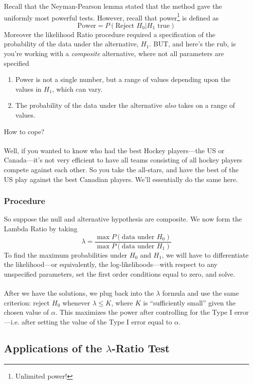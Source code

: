 \documentclass[a4paper,12pt]{scrartcl}
\begin{document}
Recall that the Neyman-Pearson lemma stated that the method gave
the uniformly most powerful tests. However, recall that power\footnote{
Unlimited power!} is defined as
   \[ \text{Power} = P(\text{Reject $H_0$} | \text{$H_1$ true}) \]
Moreover the likelihood Ratio procedure required a specification
of the probability of the data under the alternative, $H_1$. BUT,
and here's the rub, is you're working with a \emph{composite}
alternative, where not all parameters are specified
\begin{enumerate}
   \item Power is not a single number, but a range of values
      depending upon the values in $H_1$, which can vary.
   \item The probability of the data under the alternative \emph{also}
      takes on a range of values.
\end{enumerate}
How to cope?
\\
\\
Well, if you wanted to know who had the best Hockey players---the US
or Canada---it's not very efficient to have all teams consisting of
all hockey players compete against each other. So you take the
all-stars, and have the best of the US play against the best Canadian
players.  We'll essentially do the same here.

\subsubsection{Procedure}

So suppose the null and alternative hypothesis are composite.
We now form the Lambda Ratio by taking
\[ \lambda =
   \frac{\max P(\text{data under $H_0$})}{
      \max P(\text{data under $H_1$})}
   \]
To find the maximum probabilities under $H_0$ and $H_1$, we
will have to differentiate the likelihood---or equivalently, the
log-likelihoods---with respect to any unspecified parameters, set
the first order conditions equal to zero, and solve.
\\
\\
After we have the solutions, we plug back into the $\lambda$ formula
and use the same criterion:
reject $H_0$ whenever $\lambda\leq K$,
where $K$ is ``sufficiently small'' given the chosen value of $\alpha$.
This maximizes the power after controlling for the Type I error---i.e.
after setting the value of the Type I error equal to $\alpha$.


\newpage
\subsection{Applications of the $\lambda$-Ratio Test}
\end{document}
